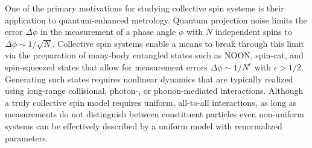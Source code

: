 \documentclass[pra,reprint,longbibliography]{revtex4-1}
\renewcommand{\t}{\text} %
\newcommand{\z}{\text{z}}
\newcommand{\1}{\mathds{1}}
\begin{document}
One of the primary motivations for studying collective spin systems is
their application to quantum-enhanced metrology.  Quantum projection
noise limits the error $\Delta\phi$ in the measurement of a phase
angle $\phi$ with $N$ independent spins to
$\Delta\phi\sim1/\sqrt{N}$\cite{wineland1992spin, itano1993quantum,
  ma2011quantum}.  Collective spin systems enable a means to break
through this limit via the preparation of many-body entangled states
such as NOON\cite{jones2009magnetic, chen2010heralded,
  zhong2010simplified}, spin-cat\cite{huang2015quantum,
  agarwal1997atomic, lau2014proposal}, and spin-squeezed
states\cite{takano2009spin, riedel2010atomchipbased,
  gross2010nonlinear, hosten2016quantum, norcia2018cavitymediated,
  wineland1992spin, kitagawa1993squeezed, ma2011quantum} that allow
for measurement errors $\Delta\phi\sim1/N^\epsilon$ with
$\epsilon>1/2$.  Generating such states requires nonlinear dynamics
that are typically realized using long-range collisional, photon-, or
phonon-mediated interactions.
Although a truly collective spin model requires uniform, all-to-all
interactions, as long as measurements do not distinguish between
constituent particles even non-uniform systems can be effectively
described by a uniform model with renormalized
parameters\cite{hu2015entangled}.
\end{document}
